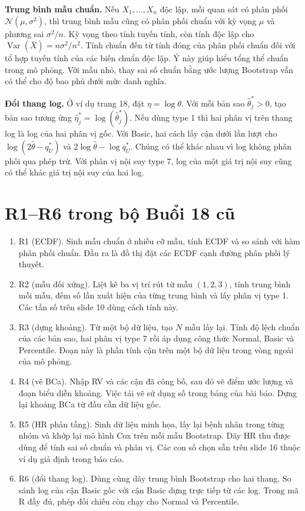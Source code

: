 \documentclass[11pt,a4paper]{article}
\begin{document}
\textbf{Trung bình mẫu chuẩn.}
Nếu $X_1,\ldots,X_n$ độc lập, mỗi quan sát có phân phối $\mathcal N(\mu,\sigma^2)$,
thì trung bình mẫu cũng có phân phối chuẩn với kỳ vọng $\mu$ và phương sai
$\sigma^2/n$. Kỳ vọng theo tính tuyến tính, còn tính độc lập cho
$\operatorname{Var}(\bar X)=n\sigma^2/n^2$. Tính chuẩn đến từ tính đóng
của phân phối chuẩn đối với tổ hợp tuyến tính của các biến chuẩn độc lập.
Ý này giúp hiểu tổng thể chuẩn trong mô phỏng. Với mẫu nhỏ, thay sai số chuẩn
bằng ước lượng Bootstrap vẫn có thể cho độ bao phủ dưới mức danh nghĩa.

\textbf{Đổi thang log.}
Ở ví dụ trang 18, đặt $\eta=\log\theta$. Với mỗi bản sao $\hat\theta_j^*>0$,
tạo bản sao tương ứng $\hat\eta_j^*=\log(\hat\theta_j^*)$.
Nếu dùng type 1 thì hai phân vị trên thang log là log của hai phân vị gốc.
Với Basic, hai cách lấy cận dưới lần lượt cho
$\log(2\hat\theta-q_U^*)$ và $2\log\hat\theta-\log q_U^*$.
Chúng có thể khác nhau vì log không phân phối qua phép trừ.
Với phân vị nội suy type 7, log của một giá trị nội suy cũng có thể khác
giá trị nội suy của hai log.

\section{R1--R6 trong bộ Buổi 18 cũ}
\begin{enumerate}
    \item R1 (ECDF). Sinh mẫu chuẩn ở nhiều cỡ mẫu, tính ECDF và so sánh
    với hàm phân phối chuẩn. Đầu ra là đồ thị đặt các ECDF cạnh đường phân phối lý thuyết.
    \item R2 (mẫu đối xứng). Liệt kê ba vị trí rút từ mẫu $(1,2,3)$, tính
    trung bình mỗi mẫu, đếm số lần xuất hiện của từng trung bình và lấy phân vị
    type 1. Các tần số trên slide 10 dùng cách tính này.
    \item R3 (dựng khoảng). Từ một bộ dữ liệu, tạo $N$ mẫu lấy lại.
    Tính độ lệch chuẩn của các bản sao, hai phân vị type 7 rồi áp dụng
    công thức Normal, Basic và Percentile. Đoạn này là phần tính cận
    trên một bộ dữ liệu trong vòng ngoài của mô phỏng.
    \item R4 (vẽ BCa). Nhập RV và các cận đã công bố, sau đó vẽ điểm
    ước lượng và đoạn biểu diễn khoảng. Việc tái vẽ sử dụng số trong bảng
    của bài báo. Dựng lại khoảng BCa từ đầu cần dữ liệu gốc.
    \item R5 (HR phân tầng). Sinh dữ liệu minh họa, lấy lại bệnh nhân
    trong từng nhóm và khớp lại mô hình Cox trên mỗi mẫu Bootstrap.
    Dãy HR thu được dùng để tính sai số chuẩn và phân vị. Các con số
    chọn sẵn trên slide 16 thuộc ví dụ giả định trong báo cáo.
    \item R6 (đổi thang log). Dùng cùng dãy trung bình Bootstrap cho hai
    thang. So sánh log của cận Basic gốc với cận Basic dựng trực tiếp
    từ các log. Trong mã R đầy đủ, phép đối chiếu còn chạy cho Normal
    và Percentile.
\end{enumerate}
\end{document}
